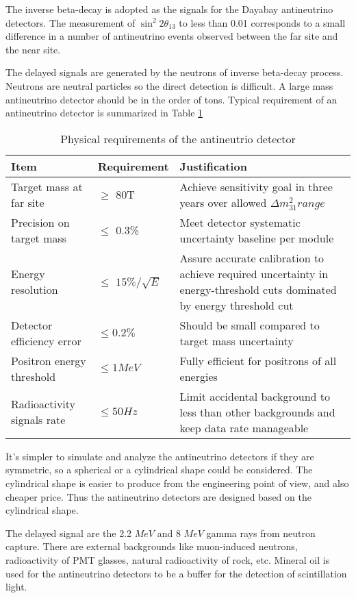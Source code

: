 The inverse beta-decay is adopted as the signals for the Dayabay antineutrino detectors.
The measurement of $\sin^{2}{2\theta_{13}}$ to less than 0.01 corresponds to a small
difference in a number of antineutrino events observed between the far site and
the near site.

The delayed signals are generated by the neutrons of inverse beta-decay process.
Neutrons are neutral particles so the direct detection is difficult.
A large mass antineutrino detector should be in the order of tons.
Typical requirement of an antineutrino detector is summarized in Table \ref{tab:ADRequirement}


\begin{table}
\centering
\caption{Physical requirements of the antineutrio detector\cite{TDR}}
\label{tab:ADRequirement}
\begin{tabular}{lp{2.5cm}p{5.0cm}}
\hline
Item & Requirement & Justification\\
\hline
\hline
Target mass at far site &
$\geq$ 80T &
Achieve sensitivity goal in three years over allowed ${\Delta}m^{2}_31 range$ \\
\hline
Precision on target mass &
$\leq$ 0.3\% &
Meet detector systematic uncertainty baseline per module \\
\hline
Energy resolution &
$\leq$ $15\%/\sqrt{E}$ &
Assure accurate calibration to achieve required uncertainty in energy-threshold cuts dominated by energy threshold cut \\
\hline
Detector efficiency error &
$\leq 0.2\%$ &
Should be small compared to target mass uncertainty \\
\hline
Positron energy threshold &
$\leq 1MeV$ &
Fully efficient for positrons of all energies \\
Radioactivity signals rate &
$\leq 50 Hz$ &
Limit accidental background to less than other backgrounds and keep data rate manageable \\
\hline
\end{tabular}
\end{table}


It's simpler to simulate and analyze the antineutrino detectors if they are
symmetric, so a spherical or a cylindrical shape could be considered. The cylindrical
shape is easier to produce from the engineering point of view, and also cheaper
price. Thus the antineutrino detectors are designed based on the cylindrical shape.

The delayed signal are the 2.2 $MeV$ and 8 $MeV$ gamma rays from neutron capture. There are external backgrounds like
muon-induced neutrons, radioactivity of PMT glasses, natural radioactivity of rock, etc.
Mineral oil is used for the antineutrino detectors to be a buffer for the detection of scintillation light.

